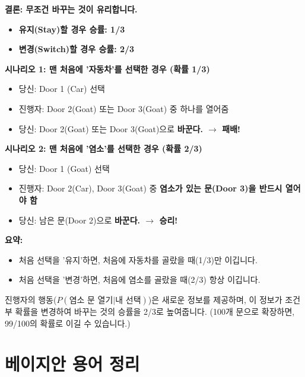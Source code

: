 \documentclass[11pt,a4paper]{book}
\theoremstyle{definition}
\begin{document}
\textbf{결론: 무조건 바꾸는 것이 유리합니다.}
\begin{itemize}
    \item \textbf{유지(Stay)할 경우 승률: 1/3}
    \item \textbf{변경(Switch)할 경우 승률: 2/3}
\end{itemize}

\begin{examplebox}[title=왜 바꾸는 것이 유리한가?]
    \textbf{시나리오 1: 맨 처음에 '자동차'를 선택한 경우 (확률 1/3)}
    \begin{itemize}
        \item 당신: Door 1 (Car) 선택
        \item 진행자: Door 2(Goat) 또는 Door 3(Goat) 중 하나를 열어줌
        \item 당신: Door 2(Goat) 또는 Door 3(Goat)으로 \textbf{바꾼다. $\to$ 패배!}
    \end{itemize}

    \textbf{시나리오 2: 맨 처음에 '염소'를 선택한 경우 (확률 2/3)}
    \begin{itemize}
        \item 당신: Door 1 (Goat) 선택
        \item 진행자: Door 2(Car), Door 3(Goat) 중 \textbf{염소가 있는 문(Door 3)을 반드시 열어야 함}
        \item 당신: 남은 문(Door 2)으로 \textbf{바꾼다. $\to$ 승리!}
    \end{itemize}

    \textbf{요약:}
    \begin{itemize}
        \item 처음 선택을 '유지'하면, 처음에 자동차를 골랐을 때(1/3)만 이깁니다.
        \item 처음 선택을 '변경'하면, 처음에 염소를 골랐을 때(2/3) 항상 이깁니다.
    \end{itemize}
    진행자의 행동($P(\text{염소 문 열기} | \text{내 선택})$)은 새로운 정보를 제공하며, 이 정보가 조건부 확률을 변경하여 바꾸는 것의 승률을 2/3로 높여줍니다. (100개 문으로 확장하면, 99/100의 확률로 이길 수 있습니다.)
\end{examplebox}


\chapter{베이지안 용어 정리}
\label{ch:lecture11}
\end{document}
